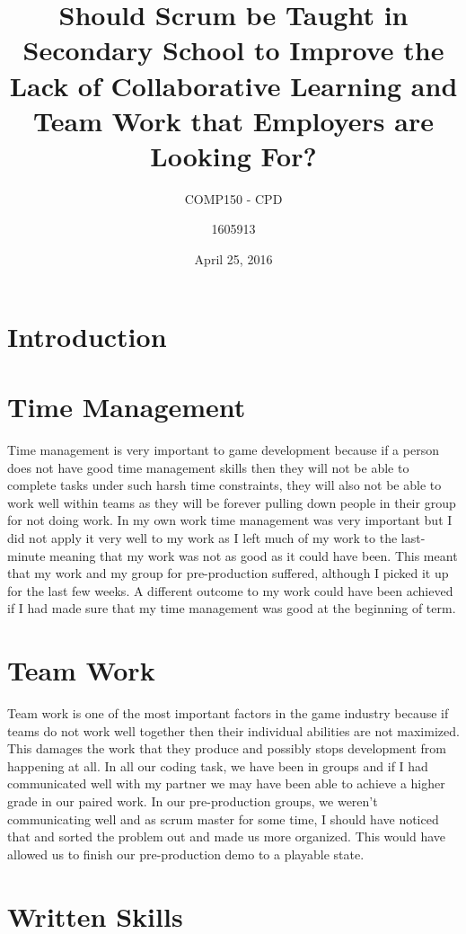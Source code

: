 \documentclass[11pt]{scrartcl}
\title{Should Scrum be Taught in Secondary School to Improve the Lack of Collaborative Learning and Team Work that Employers are Looking For?}
\date{April 25, 2016}
\subtitle{COMP150 - CPD}
\author{1605913}
\begin{document}
\maketitle

\section {Introduction}

\section {Time Management}

Time management is very important to game development because if a person does not have good time management skills then they will not be able to complete tasks under such harsh time constraints, they will also not be able to work well within teams as they will be forever pulling down people in their group for not doing work. In my own work time management was very important but I did not apply it very well to my work as I left much of my work to the last-minute meaning that my work was not as good as it could have been. This meant that my work and my group for pre-production suffered, although I picked it up for the last few weeks. A different outcome to my work could have been achieved if I had made sure that my time management was good at the beginning of term.

\section {Team Work}

Team work is one of the most important factors in the game industry because if teams do not work well together then their individual abilities are not maximized. This damages the work that they produce and possibly stops development from happening at all. In all our coding task, we have been in groups and if I had communicated well with my partner we may have been able to achieve a higher grade in our paired work. In our pre-production groups, we weren’t communicating well and as scrum master for some time, I should have noticed that and sorted the problem out and made us more organized. This would have allowed us to finish our pre-production demo to a playable state.

\section {Written Skills}
\end{document}
